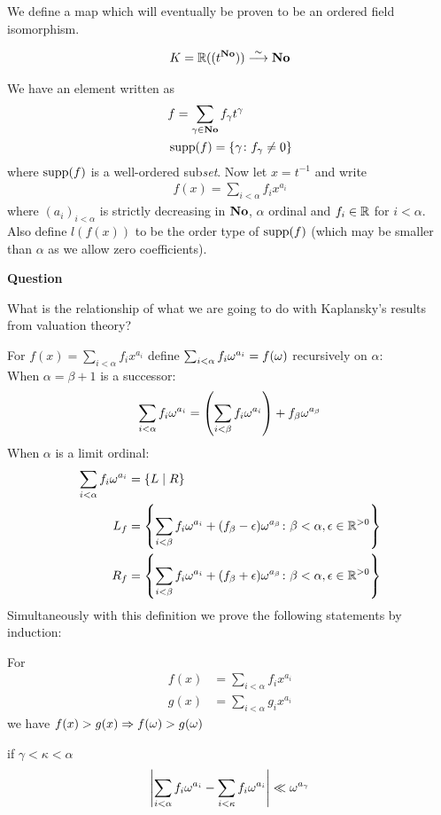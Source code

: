 
We define a map which will eventually be proven to be an ordered field isomorphism.

\begin{align*}
  K = \mathbb{R}((t^{\mathbf{No}})) \overset{\sim}{\longrightarrow} \mathbf{No}
\end{align*}

We have an element written as 
\begin{align*}
	&f = \sum_{\gamma \in \mathbf{No}} f_\gamma t^\gamma \\
	&\operatorname{supp}(f) = \{\gamma \colon f_\gamma \neq 0\}
\end{align*}
where $\operatorname{supp}(f)$ is a well-ordered sub\emph{set}. Now let $x = t^{-1}$ and write
\begin{align*}
  f(x) = \sum_{i < \alpha} f_i x^{a_i}
\end{align*}
where $(a_i)_{i<\alpha}$ is strictly decreasing in $\mathbf{No}$, $\alpha$ ordinal and $f_i \in \mathbb{R}$ for $i < \alpha$. Also define $l(f(x))$ to be the order type of $\operatorname{supp}(f)$ (which may be smaller than $\alpha$ as we allow zero coefficients).

\textbf{Question}

What is the relationship of what we are going to do with Kaplansky's results from valuation theory?

\begin{theorem} %
For $f(x) = \sum_{i < \alpha} f_i x^{a_i}$ define $\sum_{i < \alpha} f_i \omega^{a_i} = f(\omega)$ recursively on $\alpha$: \\ 
When $\alpha = \beta + 1$ is a successor:
\begin{align*}
	\sum_{i < \alpha} f_i \omega^{a_i} = \left( \sum_{i < \beta} f_i \omega^{a_i} \right) + f_\beta \omega^{a_\beta}
\end{align*}
When $\alpha$ is a limit ordinal:
\begin{align*}
	\sum_{i < \alpha} f_i \omega^{a_i} &= \left\{ L \mid R \right\} \\
  L_f &= \left\{ \sum_{i < \beta} f_i \omega^{a_i} + (f_\beta - \epsilon) \omega^{a_\beta}
	\colon \beta < \alpha, \epsilon \in \mathbb{R}^{>0} \right\} \\
  R_f &= \left\{ \sum_{i < \beta} f_i \omega^{a_i} + (f_\beta + \epsilon) \omega^{a_\beta}
	\colon \beta < \alpha, \epsilon \in \mathbb{R}^{>0} \right\}
\end{align*}
Simultaneously with this definition we prove the following statements by induction:

For \begin{align*}
	f(x) &= \sum_{i < \alpha} f_i x^{a_i} \\
	g(x) &= \sum_{i < \alpha} g_i x^{a_i}
\end{align*} we have $f(x) > g(x) \Rightarrow f(\omega) > g(\omega)$

 if $\gamma < \kappa < \alpha$
\begin{align*}
	\left| \sum_{i < \alpha} f_i \omega^{a_i} - \sum_{i < \kappa} f_i \omega^{a_i} \right| \ll \omega^{a_\gamma}
\end{align*}
\end{theorem}


